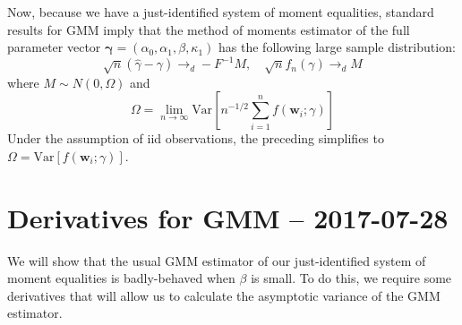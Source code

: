 \documentclass[12pt]{article}
\begin{document}
Now, because we have a just-identified system of moment equalities, standard results for GMM imply that the method of moments estimator of the full parameter vector $\boldsymbol{\gamma} = (\alpha_0, \alpha_1, \beta, \kappa_1)$ has the following large sample distribution:
\[
  \sqrt{n}\left( \widehat{\gamma} - \gamma \right) \rightarrow_d -F^{-1} M, \quad \sqrt{n}f_n(\gamma) \rightarrow_d M
\]
where $M \sim N(0, \Omega)$ and
\[
  \Omega = \lim_{n\rightarrow \infty}\mbox{Var}\left[ n^{-1/2}\sum_{i=1}^n f(\mathbf{w}_i; \gamma) \right]
\]
Under the assumption of iid observations, the preceding simplifies to $\Omega = \mbox{Var}\left[ f(\mathbf{w}_i;\gamma) \right]$.







\section{Derivatives for GMM -- 2017-07-28}
We will show that the usual GMM estimator of our just-identified system of moment equalities is badly-behaved when $\beta$ is small.
To do this, we require some derivatives that will allow us to calculate the asymptotic variance of the GMM estimator.
\end{document}
